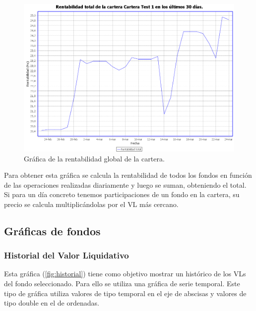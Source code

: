 \documentclass[12pt, a4paper]{book}
\begin{document}
	\begin{figure}[htbp]
	\centering
	\includegraphics[width=\textwidth]{figuras/renttotal.PNG}
	\caption{Gráfica de la rentabilidad global de la cartera.}
	\label{fig:renttotal}
	\end {figure}


Para obtener esta gráfica se calcula la rentabilidad de todos los fondos en función de las operaciones realizadas diariamente y luego se suman, obteniendo el total. Si para un día concreto tenemos participaciones de un fondo en la cartera, su precio se calcula multiplicándolas por el \gls{VL} más cercano.
\newpage

\subsection{Gráficas de fondos}

\subsubsection{Historial del Valor Liquidativo}

Esta gráfica (\ref{fig:historial}) tiene como objetivo mostrar un histórico de los \gls{VL}s del fondo seleccionado. Para ello se utiliza una gráfica de serie temporal. Este tipo de gráfica utiliza valores de tipo temporal en el eje de abscisas y valores de tipo double en el de ordenadas.\\
\end{document}
